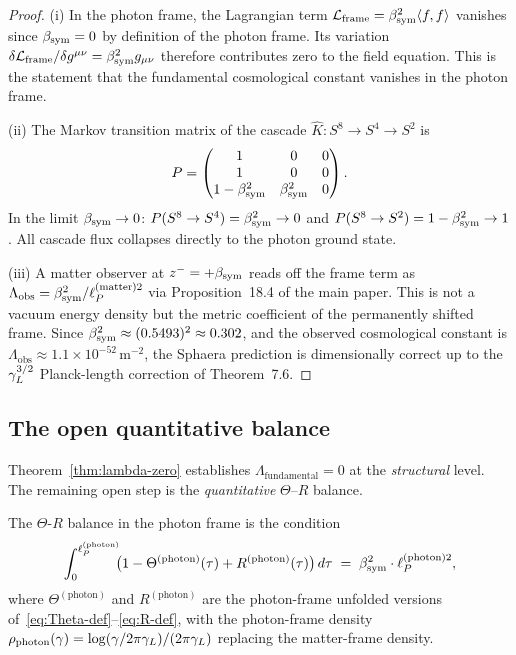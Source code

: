 \begin{proof}
(i) In the photon frame, the Lagrangian term
$\mathcal{L}_{\mathrm{frame}} = \beta_{\mathrm{sym}}^2\langle f,f\rangle$ vanishes
since $\beta_{\mathrm{sym}} = 0$ by definition of the photon frame. Its variation
$\delta\mathcal{L}_{\mathrm{frame}}/\delta g^{\mu\nu} = \beta_{\mathrm{sym}}^2
g_{\mu\nu}$ therefore contributes zero to the field equation.
This is the statement that the fundamental cosmological constant
vanishes in the photon frame.

(ii) The Markov transition matrix of the cascade
$\hat{K}: S^8 \to S^4 \to S^2$ is
\[
 P = \begin{pmatrix}1&0&0\\1&0&0\\1-\beta_{\mathrm{sym}}^2&\beta_{\mathrm{sym}}^2&0\end{pmatrix}.
\]
In the limit $\beta_{\mathrm{sym}}\to 0$: $P(S^8\to S^4) = \beta_{\mathrm{sym}}^2 \to 0$ and
$P(S^8\to S^2) = 1-\beta_{\mathrm{sym}}^2 \to 1$.
All cascade flux collapses directly to the photon ground state.

(iii) A matter observer at $z^- = +\beta_{\mathrm{sym}}$ reads off the frame term
as $\Lambda_{\mathrm{obs}} = \beta_{\mathrm{sym}}^2/\ell_P^{(\mathrm{matter})2}$ via
Proposition~18.4 of the main paper. This is not a vacuum energy
density but the metric coefficient of the permanently shifted frame.
Since $\beta_{\mathrm{sym}}^2 \approx (0.5493)^2 \approx 0.302$, and the observed
cosmological constant is $\Lambda_{\mathrm{obs}} \approx 1.1\times
10^{-52}\,\mathrm{m}^{-2}$, the Sphaera prediction is dimensionally
correct up to the $\gamma_L^{3/2}$ Planck-length correction of Theorem~7.6.
\end{proof}


\subsection{The open quantitative balance}
\label{ssec:open-balance}

Theorem~\ref{thm:lambda-zero} establishes $\Lambda_{\mathrm{fundamental}}=0$
at the \emph{structural} level. The remaining open step is the
\emph{quantitative} $\Theta$--$R$ balance.

\begin{definition}
\label{def:tr-balance}
The $\Theta$-$R$ balance in the photon frame is the condition
\begin{equation}\label{eq:tr-balance}
 \int_0^{\ell_P^{(\mathrm{photon})}} \!\!
 \bigl(1 - \Theta^{(\mathrm{photon})}(\tau) + R^{(\mathrm{photon})}(\tau)\bigr)
 \,d\tau \;=\; \beta_{\mathrm{sym}}^2 \cdot \ell_P^{(\mathrm{photon})2},
\end{equation}
where $\Theta^{(\mathrm{photon})}$ and $R^{(\mathrm{photon})}$ are the
photon-frame unfolded versions of~\eqref{eq:Theta-def}--\eqref{eq:R-def},
with the photon-frame density $\rho_{\mathrm{photon}}(\gamma) =
\log(\gamma/2\pi\gamma_L)/(2\pi\gamma_L)$ replacing the matter-frame density.
\end{definition}

